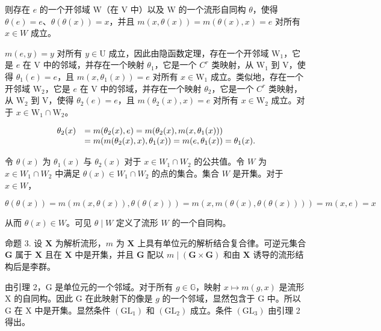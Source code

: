 则存在 \(e\) 的一个开邻域 W（在 V 中）以及 W 的一个流形自同构 \(\theta\)，使得 \(\theta(e) = e\)、\(\theta(\theta(x)) = x\)，并且 \(m(x, \theta(x)) = m(\theta(x), x) = e\) 对所有 \(x \in W\) 成立。

\(m(e,y) = y\) 对所有 \(y \in \mathrm{U}\) 成立，因此由隐函数定理，存在一个开邻域 \(\mathrm{W}_1\)，它是 \(e\) 在 \(\mathrm{V}\) 中的邻域，并存在一个映射 \(\theta_1\)，它是一个 \(C^r\) 类映射，从 \(\mathrm{W}_1\) 到 \(\mathrm{V}\)，使得 \(\theta_1(e) = e\)，且 \(m(x,\theta_1(x)) = e\) 对所有 \(x \in \mathrm{W}_1\) 成立。类似地，存在一个开邻域 \(\mathrm{W}_2\)，它是 \(e\) 在 \(\mathrm{V}\) 中的邻域，并存在一个映射 \(\theta_2\)，它是一个 \(C^r\) 类映射，从 \(\mathrm{W}_2\) 到 \(\mathrm{V}\)，使得 \(\theta_2(e) = e\)，且 \(m(\theta_2(x),x) = e\) 对所有 \(x \in \mathrm{W}_2\) 成立。对于 \(x \in \mathrm{W}_1 \cap \mathrm{W}_2\)。

\[
\begin{array}{r l} \theta_ {2} (x) & = m (\theta_ {2} (x), e) = m (\theta_ {2} (x), m (x, \theta_ {1} (x))) \\ & = m (m (\theta_ {2} (x), x), \theta_ {1} (x)) = m (e, \theta_ {1} (x)) = \theta_ {1} (x). \end{array}
\]

令 \(\theta(x)\) 为 \(\theta_1(x)\) 与 \(\theta_2(x)\) 对于 \(x \in W_1 \cap W_2\) 的公共值。令 \(W\) 为 \(x \in W_1 \cap W_2\) 中满足 \(\theta(x) \in W_1 \cap W_2\) 的点的集合。集合 \(W\) 是开集。对于 \(x \in W\)，

\[
\theta (\theta (x)) = m (m (x, \theta (x)), \theta (\theta (x))) = m (x, m (\theta (x), \theta (\theta (x)))) = m (x, e) = x
\]

从而 \(\theta(x) \in W\)。可见 \(\theta \mid W\) 定义了流形 \(W\) 的一个自同构。

命题 3. 设 \(\mathbf{X}\) 为解析流形，\(m\) 为 \(\mathbf{X}\) 上具有单位元的解析结合复合律。可逆元集合 \(\mathbf{G}\) 属于 \(\mathbf{X}\) 且在 \(\mathbf{X}\) 中是开集，并且 \(\mathbf{G}\) 配以 \(m \mid (\mathbf{G} \times \mathbf{G})\) 和由 \(\mathbf{X}\) 诱导的流形结构后是李群。

由引理 2，G 是单位元的一个邻域。对于所有 \(g \in \mathbb{G}\)，映射 \(x \mapsto m(g, x)\) 是流形 X 的自同构。因此 G 在此映射下的像是 \(g\) 的一个邻域，显然包含于 G 中。所以 G 在 X 中是开集。显然条件 \((\mathrm{GL}_1)\) 和 \((\mathrm{GL}_2)\) 成立。条件 \((\mathrm{GL}_3)\) 由引理 2 得出。

